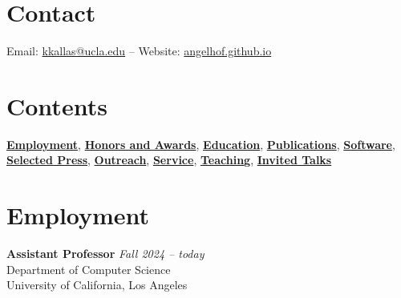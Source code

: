 \documentclass[margin]{res}
\begin{document}
\begin{resume}

\section{Contact} 
Email: \href{mailto:kkallas@ucla.edu}{kkallas@ucla.edu} -- Website: \href{https://angelhof.github.io/}{angelhof.github.io}


\section{Contents}

\hyperlink{sec:employment}{\textbf{Employment}},
\hyperlink{sec:honors}{\textbf{Honors and Awards}},
\hyperlink{sec:education}{\textbf{Education}},
\hyperlink{sec:publications}{\textbf{Publications}},
\hyperlink{sec:software}{\textbf{Software}},
\hyperlink{sec:press}{\textbf{Selected Press}},
\hyperlink{sec:outreach}{\textbf{Outreach}},
\hyperlink{sec:service}{\textbf{Service}},
\hyperlink{sec:teaching}{\textbf{Teaching}},
\hyperlink{sec:talks}{\textbf{Invited Talks}}

\section{Employment}
\hypertarget{sec:employment}{}

\textbf{Assistant Professor} \hfill {\em Fall 2024 -- today} \\
Department of Computer Science \\
University of California, Los Angeles


\end{resume}
\end{document}
